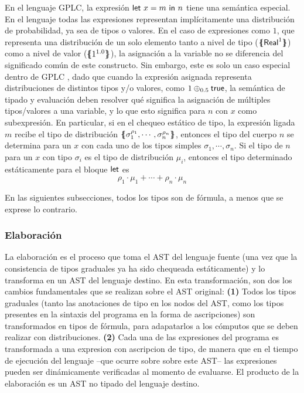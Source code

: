 En el lenguaje GPLC, la expresión $\LetTerm{x}{m}{n}$ tiene una semántica especial.
En el lenguaje todas las expresiones representan implícitamente una distribución de
probabilidad, ya sea de tipos o valores. En el caso de expresiones como $1$, que
representa una distribución de un solo elemento tanto a nivel de tipo ($\distr{\Real^1}$)
como a nivel de valor ($\distr{1^{1.0}}$), la asignación a la variable no se diferencia del significado común de este constructo. Sin embargo, este es solo un caso especial dentro de GPLC
, dado que cuando la expresión asignada representa distribuciones de distintos tipos y/o valores, como $\ChoiceTerm{0.5}{1}{\true}$, la semántica de tipado y evaluación
deben resolver qué significa la asignación de múltiples tipos/valores a una variable, y lo que esto significa para $n$ con $x$ como subexpresión. En particular, si en el chequeo
estático de tipo, la expresión ligada $m$ recibe el tipo de distribución
$\distr{\sigma_1^{\rho_1},\cdots,\sigma_n^{\rho_n}}$, entonces el tipo del cuerpo $n$ se determina para un $x$ con cada uno de los tipos simples
$\sigma_1, \cdots, \sigma_n$. Si el tipo de $n$ para un $x$ con tipo $\sigma_i$ es el tipo de distribución $\mu_i$, entonces el tipo determinado estáticamente para el bloque $\LetKW$ es
\[ \rho_1\cdot\mu_1 + \cdots + \rho_n\cdot\mu_n\]





En las siguientes subsecciones, todos los tipos son de fórmula, a menos que se exprese lo contrario.

\subsubsection{Elaboración}\label{sec:elab}
  
La elaboración es el proceso que toma el AST del lenguaje fuente (una
vez que la consistencia de tipos graduales ya ha sido chequeada
estáticamente) y lo transforma en un AST del lenguaje destino. En esta
transformación, son dos los cambios fundamentales que se realizan
sobre el AST original: \textbf{(1)} Todos los tipos graduales (tanto
las anotaciones de tipo en los nodos del AST, como los tipos presentes
en la sintaxis del programa en la forma de ascripciones) son
transformados en tipos de fórmula, para adapatarlos a los cómputos que
se deben realizar con distribuciones. \textbf{(2)} Cada una de las
expresiones del programa es transformada a una expresion con
ascripcion de tipo, de manera que en el tiempo de ejecución del lenguaje --que
ocurre sobre sobre este AST-- las expresiones pueden ser dinámicamente
verificadas al momento de evaluarse. El producto de la elaboración es
un AST no tipado del lenguaje destino.

